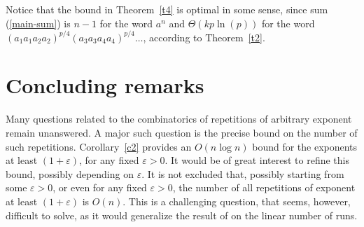 \documentclass[11pt]{article}
\def\paren#1{\left( #1 \right)}
\begin{document}
Notice that the bound in Theorem~\ref{t4} is optimal in some sense, since
sum (\ref{main-sum}) is $n-1$ for the word $a^n$ and $\Theta\paren{kp\ln(p)}$ for the word
$(a_1a_1a_2a_2)^{p/4}(a_3a_3a_4a_4)^{p/4}\ldots$, according to
Theorem~\ref{t2}. 

\section{Concluding remarks}

Many questions related to the combinatorics of repetitions of
arbitrary exponent remain unanswered. A major such question is the
precise bound on the number of such repetitions. Corollary~\ref{c2}
provides an $O(n\log n)$ bound for the exponents at least
$(1+\varepsilon)$, for any fixed $\varepsilon>0$. It would be of great
interest to refine this bound, possibly depending on $\varepsilon$. It
is not excluded that, possibly starting from some $\varepsilon>0$, or
even for any fixed $\varepsilon>0$, the number of all repetitions of
exponent at least $(1+\varepsilon)$ is $O(n)$. This is a challenging
question, that seems, however, difficult to solve, as it would
generalize the result of
\cite{KolpakovKucherovFCT99,KolpakovKucherovJDA00} on the linear
number of runs.


\end{document}

